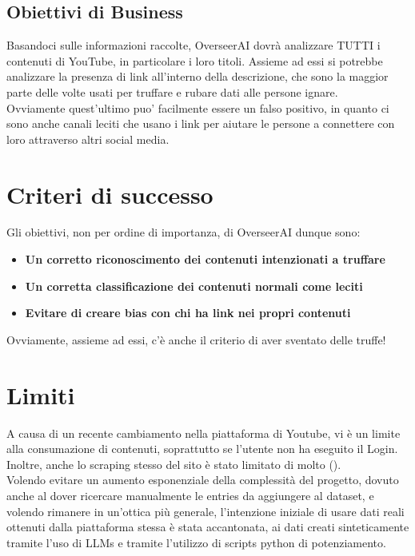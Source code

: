 \documentclass[a4paper,12pt]{report}
\begin{document}
\subsection{Obiettivi di Business}
Basandoci sulle informazioni raccolte, OverseerAI dovrà analizzare TUTTI i contenuti di YouTube, in particolare i loro titoli. Assieme ad essi si potrebbe analizzare la presenza di link all'interno della descrizione, che sono la maggior parte delle volte usati per truffare e rubare dati alle persone ignare.\\
Ovviamente quest'ultimo puo' facilmente essere un falso positivo, in quanto ci sono anche canali leciti che usano i link per aiutare le persone a connettere con loro attraverso altri social media.

\newpage
\section{Criteri di successo}
Gli obiettivi, non per ordine di importanza, di OverseerAI dunque sono:
\begin{itemize}
    \item \textbf{Un corretto riconoscimento dei contenuti intenzionati a truffare}
    \item \textbf{Un corretta classificazione dei contenuti normali come leciti}
    \item \textbf{Evitare di creare bias con chi ha link nei propri contenuti}
\end{itemize}
Ovviamente, assieme ad essi, c'è anche il criterio di aver sventato delle truffe!

\section{Limiti}
A causa di un recente cambiamento nella piattaforma di Youtube, vi è un limite alla consumazione di contenuti, soprattutto se l'utente non ha eseguito il Login.\\
Inoltre, anche lo scraping stesso del sito è stato limitato di molto (\href{https://web.archive.org/web/20240807161716/https://www.tomsguide.com/ai/nvidia-accused-of-scraping-80-years-worth-of-of-videos-daily-to-train-ai-models-what-you-need-to-know}{\color{blue}{causa}}).\\
Volendo evitare un aumento esponenziale della complessità del progetto, dovuto anche al dover ricercare manualmente le entries da aggiungere al dataset, e volendo rimanere in un'ottica più generale, l'intenzione iniziale di usare dati reali ottenuti dalla piattaforma stessa è stata accantonata,  ai dati creati sinteticamente tramite l'uso di LLMs e tramite l'utilizzo di scripts python di potenziamento.
\end{document}

